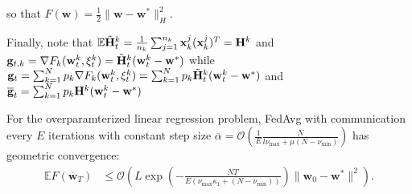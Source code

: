 so that $F(\mathbf{w})=\frac{1}{2}\|\mathbf{w}-\mathbf{w}^{\ast}\|_{H}^{2}$.

Finally, note that $\mathbb{E}\tilde{{\mathbf{H}}}_{t}^{k}=\frac{1}{n_{k}}\sum_{j=1}^{n_{k}}\mathbf{x}_{k}^{j}(\mathbf{x}_{k}^{j})^{T}={\mathbf{H}}^{k}$
and $\mathbf{g}_{t,k}=\nabla F_{k}(\mathbf{w}_{t}^{k},\xi_{t}^{k})=\tilde{{\mathbf{H}}}_{t}^{k}(\mathbf{w}_{t}^{k}-\mathbf{w}^{\ast})$
while $\mathbf{g}_{t}=\sum_{k=1}^{N}p_{k}\nabla F_{k}(\mathbf{w}_{t}^{k},\xi_{t}^{k})=\sum_{k=1}^{N}p_{k}\tilde{{\mathbf{H}}}_{t}^{k}(\mathbf{w}_{t}^{k}-\mathbf{w}^{\ast})$ and $\overline{\mathbf{g}}_{t}=\sum_{k=1}^{N}p_{k}{\mathbf{H}}^{k}(\mathbf{w}_{t}^{k}-\mathbf{w}^{\ast})$ 
\\
	\begin{thm}
		For the overparamterized linear regression problem, FedAvg with communication every $E$
		iterations with constant step size $\overline{\alpha}=\mathcal{O}(\frac{1}{E}\frac{N}{l\nu_{\max}+\mu(N-\nu_{\min})})$
		has geometric convergence:
		\begin{align*}
		\mathbb{E}F(\overline{\mathbf{w}}_{T}) & \leq\mathcal{O}\left(L\exp(-\frac{NT}{E(\nu_{\max}\kappa_{1}+(N-\nu_{\min}))})\|\mathbf{w}_{0}-\mathbf{w}^{\ast}\|^{2}\right).
		\end{align*}
	\end{thm}
